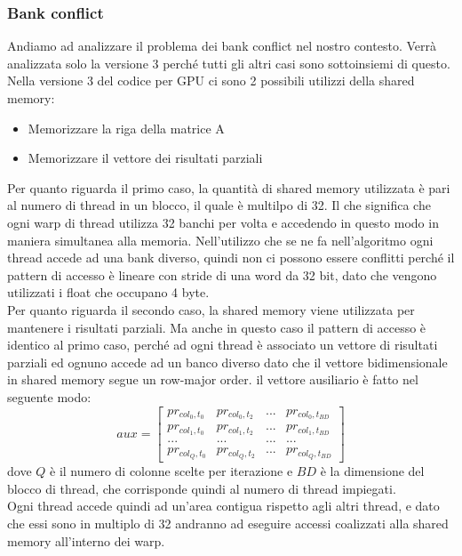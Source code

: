 \documentclass[conference]{IEEEtran}
\begin{document}
\subsubsection{Bank conflict}
Andiamo ad analizzare il problema dei bank conflict nel nostro contesto. Verrà analizzata solo la versione 3 perché tutti gli altri casi sono sottoinsiemi di questo.\\
Nella versione 3 del codice per GPU ci sono 2 possibili utilizzi della shared memory: 
\begin{itemize}
    \item Memorizzare la riga della matrice A 
    \item Memorizzare il vettore dei risultati parziali
\end{itemize}
Per quanto riguarda il primo caso, la quantità di shared memory utilizzata è pari al numero di thread in un blocco, il quale è multilpo di 32. Il che significa che ogni warp di thread utilizza 32 banchi per volta e accedendo in questo modo in maniera simultanea alla memoria. Nell'utilizzo che se ne fa nell'algoritmo ogni thread accede ad una bank diverso, quindi non ci possono essere conflitti perché il pattern di accesso è lineare con stride di una word da 32 bit, dato che vengono utilizzati i float che occupano 4 byte.\\
Per quanto riguarda il secondo caso, la shared memory viene utilizzata per mantenere i risultati parziali. Ma anche in questo caso il pattern di accesso è identico al primo caso, perché ad ogni thread è associato un vettore di risultati parziali ed ognuno accede ad un banco diverso dato che il vettore bidimensionale in shared memory segue un row-major order. il vettore ausiliario è fatto nel seguente modo:
\[
aux = \left[
\begin{matrix}
pr_{col_0, t_0} & pr_{col_0, t_2} & ... & pr_{col_0, t_{BD}} \\
pr_{col_1, t_0} & pr_{col_1, t_2} & ... & pr_{col_1, t_{BD}} \\
... & ... & ... & ... \\
pr_{col_{Q}, t_0} & pr_{col_{Q}, t_2} & ... & pr_{col_{Q}, t_{BD}}
\end{matrix}\right]
\]
dove $Q$ è il numero di colonne scelte per iterazione e $BD$ è la dimensione del blocco di thread, che corrisponde quindi al numero di thread impiegati.\\
Ogni thread accede quindi ad un'area contigua rispetto agli altri thread, e dato che essi sono in multiplo di 32 andranno ad eseguire accessi coalizzati alla shared memory all'interno dei warp.
\end{document}

